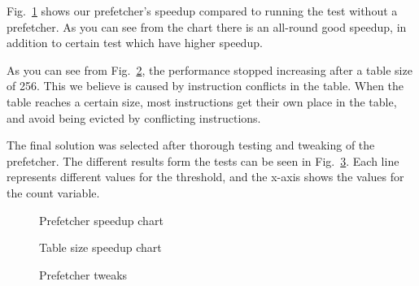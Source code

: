 Fig.~\ref{fig:prefetcher_speedup} shows our prefetcher's speedup compared to
running the test without a prefetcher. As you can see from the chart there is
an all-round good speedup, in addition to certain test which have higher
speedup.

As you can see from Fig.~\ref{fig:table_size_chart}, the performance stopped
increasing after a table size of 256. This we believe is caused by instruction
conflicts in the table. When the table reaches a certain size, most
instructions get their own place in the table, and avoid being evicted by
conflicting instructions.

The final solution was selected after thorough testing and tweaking of the
prefetcher. The different results form the tests can be seen in
Fig.~\ref{fig:prefetcher_tweaks}. Each line represents different values for the
threshold, and the x-axis shows the values for the count variable.

\begin{figure}
	
	\caption{Prefetcher speedup chart}
	\label{fig:prefetcher_speedup}
\end{figure}

\begin{figure}
	
	\caption{Table size speedup chart}
	\label{fig:table_size_chart}
\end{figure}

\begin{figure}
	
	\caption{Prefetcher tweaks}
	\label{fig:prefetcher_tweaks}
\end{figure}
